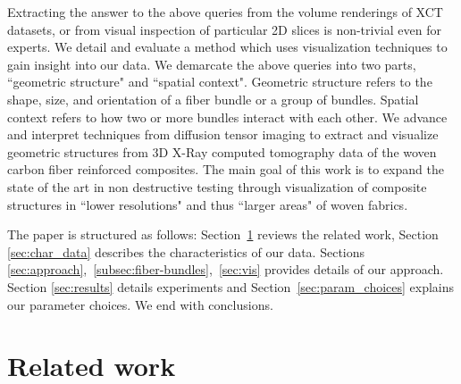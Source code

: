 Extracting the answer to the above queries from the volume renderings of XCT datasets, or from visual inspection of particular 2D slices is non-trivial even for experts. We detail and evaluate a method which uses visualization techniques to gain insight into our data. We demarcate the above queries into two parts, ``geometric structure" and ``spatial context". Geometric structure refers to the shape, size, and orientation of a fiber bundle or a group of bundles. Spatial context refers to how two or more bundles interact with each other. 
We advance and interpret techniques from diffusion tensor imaging to extract and visualize geometric structures from 3D X-Ray computed tomography data of the woven carbon fiber reinforced composites. The main goal of this work is to expand the state of the art in non destructive testing through visualization of composite structures in ``lower resolutions" and thus ``larger areas" of woven fabrics.

The paper is structured as follows: Section~\ref{sec:prev_work} reviews the related work,  Section \ref{sec:char_data} describes the   characteristics of our data. Sections \ref{sec:approach},~\ref{subsec:fiber-bundles},~\ref{sec:vis} provides details of our approach. Section \ref{sec:results} details experiments and Section~\ref{sec:param_choices} explains our  parameter choices. We end with conclusions.



\section {Related work}
\label{sec:prev_work}

